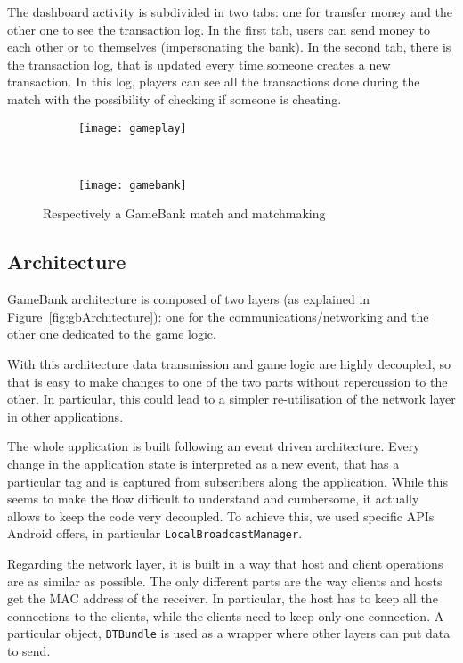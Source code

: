 The dashboard activity is subdivided in two tabs: one for transfer money and 
the other one to see the transaction log. In the first tab, users can send 
money to each other or to themselves (impersonating the bank). In the second 
tab, there is the transaction log, that is updated every time someone creates a 
new transaction. In this log, players can see all the transactions done 
during the match with the possibility of checking if someone is cheating. 

\begin{figure}[t]
    \centering
    
    \begin{subfigure}
        \centering
        \texttt{[image: gameplay]}
        \label{fig:gameplay}
    \end{subfigure}%
    ~ 
    \begin{subfigure}
        \centering
        \texttt{[image: gamebank]}
        \label{fig:gamebank}
    \end{subfigure}
    \caption{Respectively a GameBank match and matchmaking}
\end{figure}

\subsection{Architecture}

GameBank architecture is composed of two layers (as 
explained in Figure~\ref{fig:gbArchitecture}): one for the 
communications/networking and the other one dedicated to the game logic. 

With this architecture data transmission and game logic are highly decoupled, so 
that is easy to make changes to one of the two parts without repercussion to 
the other. In particular, this could lead to a simpler re-utilisation of the 
network layer in other applications.

The whole application is built following an event driven architecture. Every 
change in the application state is interpreted as a new event, that has a 
particular tag and is captured from subscribers along the application. While 
this seems to make the flow difficult to understand and cumbersome, it actually 
allows to keep the code very decoupled. To achieve this, we used specific APIs 
Android offers, in particular \texttt{LocalBroadcastManager}.

Regarding the network layer, it is built in a way that host and client 
operations are as similar as possible. The only different parts are the way 
clients and hosts get the MAC address of the receiver. In particular, the host 
has to keep all the connections to the clients, while the clients need to keep  
only one connection. A particular object, \texttt{BTBundle} is used as a wrapper 
where other layers can put data to send.

